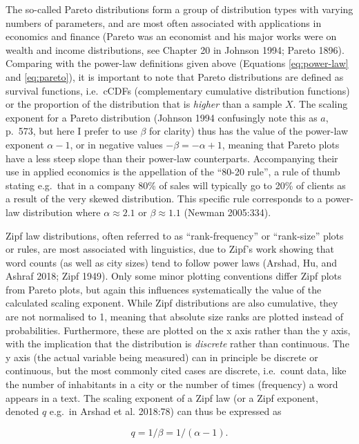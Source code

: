 \documentclass[
  12pt,
]{book}
\begin{document}
The so-called Pareto distributions form a group of distribution types with varying numbers of parameters, and are most often associated with applications in economics and finance (Pareto was an economist and his major works were on wealth and income distributions, see Chapter 20 in Johnson 1994; Pareto 1896). Comparing with the power-law definitions given above (Equations \eqref{eq:power-law} and \eqref{eq:pareto}), it is important to note that Pareto distributions are defined as survival functions, i.e.~cCDFs (complementary cumulative distribution functions) or the proportion of the distribution that is \emph{higher} than a sample \(X\). The scaling exponent for a Pareto distribution (Johnson 1994 confusingly note this as \(a\), p.~573, but here I prefer to use \(\beta\) for clarity) thus has the value of the power-law exponent \(\alpha-1\), or in negative values \(-\beta = -\alpha +1\), meaning that Pareto plots have a less steep slope than their power-law counterparts. Accompanying their use in applied economics is the appellation of the ``80-20 rule'', a rule of thumb stating e.g.~that in a company 80\% of sales will typically go to 20\% of clients as a result of the very skewed distribution. This specific rule corresponds to a power-law distribution where \(\alpha \approx 2.1\) or \(\beta \approx 1.1\) (Newman 2005:334).

Zipf law distributions, often referred to as ``rank-frequency'' or ``rank-size'' plots or rules, are most associated with linguistics, due to Zipf's work showing that word counts (as well as city sizes) tend to follow power laws (Arshad, Hu, and Ashraf 2018; Zipf 1949). Only some minor plotting conventions differ Zipf plots from Pareto plots, but again this influences systematically the value of the calculated scaling exponent. While Zipf distributions are also cumulative, they are not normalised to 1, meaning that absolute size ranks are plotted instead of probabilities. Furthermore, these are plotted on the x axis rather than the y axis, with the implication that the distribution is \emph{discrete} rather than continuous. The y axis (the actual variable being measured) can in principle be discrete or continuous, but the most commonly cited cases are discrete, i.e.~count data, like the number of inhabitants in a city or the number of times (frequency) a word appears in a text. The scaling exponent of a Zipf law (or a Zipf exponent, denoted \(q\) e.g.~in Arshad et al. 2018:78) can thus be expressed as

\begin{equation}
q = 1/\beta = 1/(\alpha-1).
\label{eq:zipf-exponent}
\end{equation}
\end{document}
